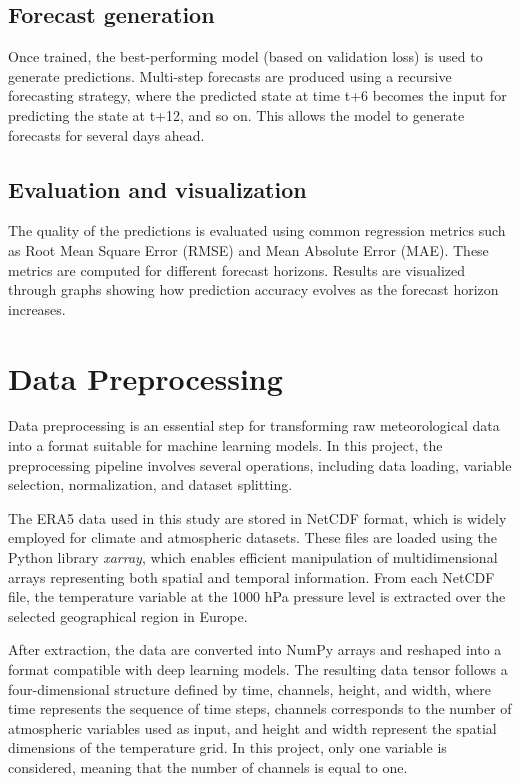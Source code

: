 \subsection{Forecast generation}

Once trained, the best-performing model (based on validation loss) is used to generate predictions. Multi-step forecasts are produced using a recursive forecasting strategy, where the predicted state at time t+6 becomes the input for predicting the state at t+12, and so on. This allows the model to generate forecasts for several days ahead.

\subsection{Evaluation and visualization}

The quality of the predictions is evaluated using common regression metrics such as Root Mean Square Error (RMSE) and Mean Absolute Error (MAE). These metrics are computed for different forecast horizons. Results are visualized through graphs showing how prediction accuracy evolves as the forecast horizon increases.

\section{Data Preprocessing}

Data preprocessing is an essential step for transforming raw meteorological data into a format suitable for machine learning models. In this project, the preprocessing pipeline involves several operations, including data loading, variable selection, normalization, and dataset splitting.

The ERA5 data used in this study are stored in NetCDF format, which is widely employed for climate and atmospheric datasets. These files are loaded using the Python library \textit{xarray}, which enables efficient manipulation of multidimensional arrays representing both spatial and temporal information. From each NetCDF file, the temperature variable at the 1000 hPa pressure level is extracted over the selected geographical region in Europe.

After extraction, the data are converted into NumPy arrays and reshaped into a format compatible with deep learning models. The resulting data tensor follows a four-dimensional structure defined by time, channels, height, and width, where time represents the sequence of time steps, channels corresponds to the number of atmospheric variables used as input, and height and width represent the spatial dimensions of the temperature grid. In this project, only one variable is considered, meaning that the number of channels is equal to one.

